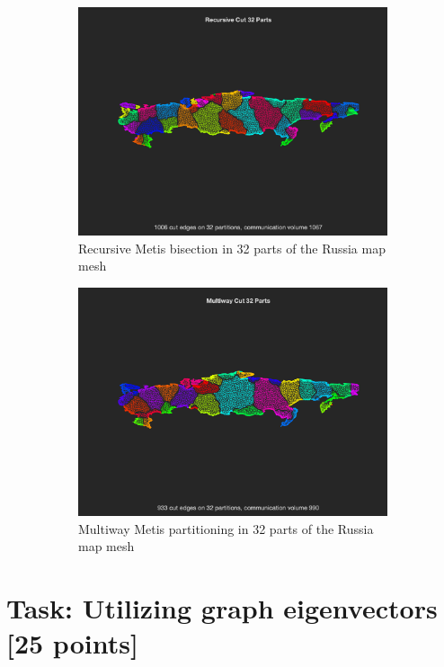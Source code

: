 \documentclass[unicode,11pt,a4paper,oneside,numbers=endperiod,openany]{scrartcl}
\begin{document}
\begin{figure}[!ht]
\begin{subfigure}[b]{0.49\textwidth}
            \centering 
            \includegraphics[width=\textwidth]{russia_rec.png}
            {{\small Recursive Metis bisection in 32 parts of the Russia map mesh}}    
        \end{subfigure} 
	\begin{subfigure}[b]{0.49\textwidth}   
            \centering 
            \includegraphics[width=\textwidth]{russia_kway.png}
            {{\small Multiway Metis partitioning in 32 parts of the Russia map mesh}}    
        \end{subfigure} 
    \label{figure:metismeshes}
    \end{figure}

\section{Task: Utilizing graph eigenvectors [25 points]}
\end{document}
